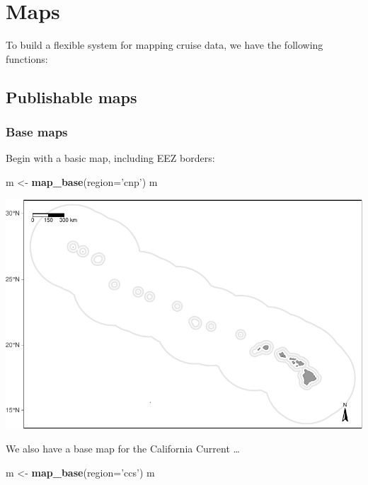 \documentclass[
]{book}
\newenvironment{Shaded}{\begin{snugshade}}{\end{snugshade}}
\newcommand{\DataTypeTok}[1]{\textcolor[rgb]{0.13,0.29,0.53}{#1}}
\newcommand{\KeywordTok}[1]{\textcolor[rgb]{0.13,0.29,0.53}{\textbf{#1}}}
\newcommand{\NormalTok}[1]{#1}
\newcommand{\StringTok}[1]{\textcolor[rgb]{0.31,0.60,0.02}{#1}}
\begin{document}
\hypertarget{maps}{%
\chapter{Maps}\label{maps}}

To build a flexible system for mapping cruise data, we have the following functions:

\hypertarget{publishable-maps}{%
\section*{Publishable maps}\label{publishable-maps}}

\hypertarget{base-maps}{%
\subsection*{Base maps}\label{base-maps}}

Begin with a basic map, including EEZ borders:

\begin{Shaded}
\begin{Highlighting}[]
\NormalTok{m <-}\StringTok{ }\KeywordTok{map_base}\NormalTok{(}\DataTypeTok{region=}\StringTok{'cnp'}\NormalTok{)}
\NormalTok{m}
\end{Highlighting}
\end{Shaded}

\includegraphics{figures/unnamed-chunk-50-1.pdf}

We also have a base map for the California Current \ldots{}

\begin{Shaded}
\begin{Highlighting}[]
\NormalTok{m <-}\StringTok{ }\KeywordTok{map_base}\NormalTok{(}\DataTypeTok{region=}\StringTok{'ccs'}\NormalTok{)}
\NormalTok{m}
\end{Highlighting}
\end{Shaded}
\end{document}
